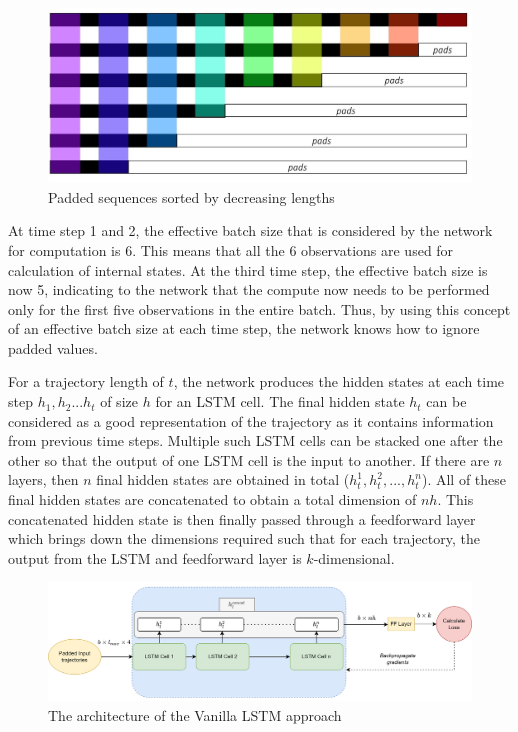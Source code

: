\documentclass{article}
\begin{document}
\begin{figure}[H]
\centering
\includegraphics[scale=0.2]{method/pads.png}
\caption{Padded sequences sorted by decreasing lengths}
\end{figure}



At time step 1 and 2, the effective batch size that is considered by the network for computation is 6. This means that all the 6 observations are used for calculation of internal states. At the third time step, the effective batch size is now 5, indicating to the network that the compute now needs to be performed only for the first five observations in the entire batch. Thus, by using this concept of an effective batch size at each time step, the network knows how to ignore padded values.

For a trajectory length of $t$, the network produces the hidden states at each time step $h_1,h_2...h_t$ of size $h$ for an LSTM cell. The final hidden state $h_t$ can be considered as a good representation of the trajectory as it contains information from previous time steps. Multiple such LSTM cells can be stacked one after the other so that the output of one LSTM cell is the input to another. If there are $n$ layers, then $n$ final hidden states are obtained in total ($h_t^1,h_t^2,...,h_t^n$). All of these final hidden states are concatenated to obtain a total dimension of $nh$. This concatenated hidden state is then finally passed through a feedforward layer which brings down the dimensions required such that for each trajectory, the output from the LSTM and feedforward layer is $k$-dimensional.

\begin{figure}[H]
\centering
\includegraphics[scale=0.2]{method/lstm.png}
\caption{The architecture of the Vanilla LSTM approach}
\end{figure}
\end{document}
